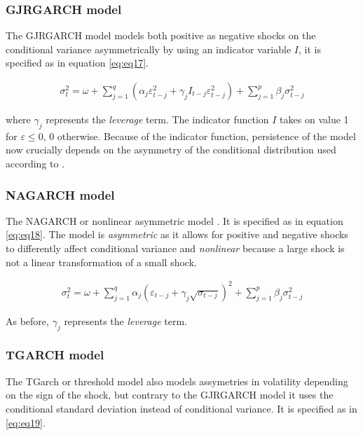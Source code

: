 \documentclass[a4paper, twoside]{templates/ociamthesis}
\begin{document}
\hypertarget{gjrgarch-model}{%
\subsubsection{GJRGARCH model}\label{gjrgarch-model}}

\noindent The GJRGARCH model \autocite{glosten1993} models both positive as negative shocks on the conditional variance asymmetrically by using an indicator variable \(I\), it is specified as in equation \eqref{eq:eq17}.

\begin{align}
\sigma_t^2 = \omega + \sum\limits_{j=1}^q (\alpha_j \varepsilon_{t-j}^2 + \gamma_j I_{t-j} \varepsilon_{t-j}^2) + \sum\limits_{j = 1}^p \beta_j \sigma_{t-j}^2
 \label{eq:eq17}
\end{align}

\noindent where \(\gamma_j\) represents the \emph{leverage} term. The indicator function \(I\) takes on value 1 for \(\varepsilon \le 0\), 0 otherwise. Because of the indicator function, persistence of the model now crucially depends on the asymmetry of the conditional distribution used according to \textcite{ghalanos2020}.

\hypertarget{nagarch-model}{%
\subsubsection{NAGARCH model}\label{nagarch-model}}

\noindent The NAGARCH or nonlinear asymmetric model \autocite{engle1993}. It is specified as in equation \eqref{eq:eq18}. The model is \emph{asymmetric} as it allows for positive and negative shocks to differently affect conditional variance and \emph{nonlinear} because a large shock is not a linear transformation of a small shock.

\begin{align}
\sigma_t^2 = \omega + \sum\limits_{j=1}^q \alpha_j (\varepsilon_{t-j}+ \gamma_j \sqrt{\sigma_{t-j}})^2 + \sum\limits_{j = 1}^p \beta_j \sigma_{t-j}^2
 \label{eq:eq18}
\end{align}

As before, \(\gamma_j\) represents the \emph{leverage} term.

\hypertarget{tgarch-model}{%
\subsubsection{TGARCH model}\label{tgarch-model}}

\noindent The TGarch or threshold model \autocite{zakoian1994} also models assymetries in volatility depending on the sign of the shock, but contrary to the GJRGARCH model it uses the conditional standard deviation instead of conditional variance. It is specified as in \eqref{eq:eq19}.
\end{document}
